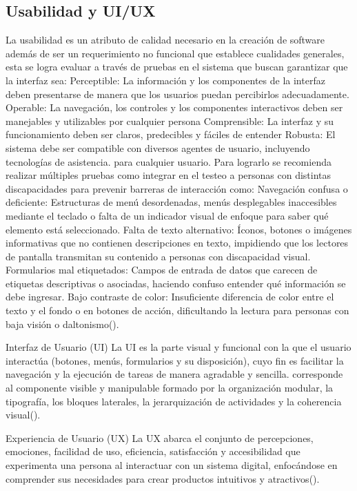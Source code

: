 \subsection{Usabilidad y UI/UX}

La usabilidad es un atributo de calidad necesario en la creación de software además de ser un requerimiento no funcional que establece cualidades generales, esta se logra evaluar a través de pruebas en el sistema que buscan garantizar que la interfaz sea:
Perceptible: La información y los componentes de la interfaz deben presentarse de manera que los usuarios puedan percibirlos adecuadamente.
Operable: La navegación, los controles y los componentes interactivos deben ser manejables y utilizables por cualquier persona
Comprensible: La interfaz y su funcionamiento deben ser claros, predecibles y fáciles de entender
Robusta: El sistema debe ser compatible con diversos agentes de usuario, incluyendo tecnologías de asistencia.
para cualquier usuario.
Para lograrlo se recomienda realizar múltiples pruebas como integrar en el testeo a personas con distintas discapacidades para prevenir barreras de interacción como:
Navegación confusa o deficiente: Estructuras de menú desordenadas, menús desplegables inaccesibles mediante el teclado o falta de un indicador visual de enfoque para saber qué elemento está seleccionado.
Falta de texto alternativo: Íconos, botones o imágenes informativas que no contienen descripciones en texto, impidiendo que los lectores de pantalla transmitan su contenido a personas con discapacidad visual.
Formularios mal etiquetados: Campos de entrada de datos que carecen de etiquetas descriptivas o asociadas, haciendo confuso entender qué información se debe ingresar.
Bajo contraste de color: Insuficiente diferencia de color entre el texto y el fondo o en botones de acción, dificultando la lectura para personas con baja visión o daltonismo(\cite{bello2025integracion}).

Interfaz de Usuario (UI)
La UI es la parte visual y funcional con la que el usuario interactúa (botones, menús, formularios y su disposición), cuyo fin es facilitar la navegación y la ejecución de tareas de manera agradable y sencilla. corresponde al componente visible y manipulable formado por la organización modular, la tipografía, los bloques laterales, la jerarquización de actividades y la coherencia visual(\cite{guaman2026moodle}).

Experiencia de Usuario (UX)
La UX abarca el conjunto de percepciones, emociones, facilidad de uso, eficiencia, satisfacción y accesibilidad que experimenta una persona al interactuar con un sistema digital, enfocándose en comprender sus necesidades para crear productos intuitivos y atractivos(\cite{guaman2026moodle}). 

